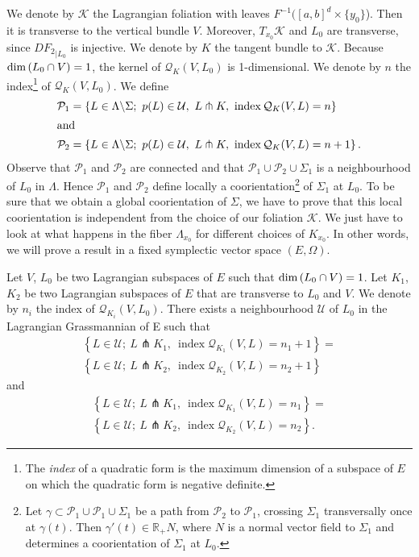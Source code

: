 \documentclass[AHL, Unicode, longabstracts, published]{cedram}
\renewcommand*\P{\mathcal{P}}
\newcommand*\cq{\mathcal{Q}}
\newcommand*\cU{\mathcal{U}}
\newcommand*\cal{\mathcal}
\newcommand*\R{\mathbb{R}}
\renewcommand*\dim{{\rm dim}\,}
\DeclareMathOperator{\Iindex}{index}
\begin{document}
We denote by ${\cal K}$ the Lagrangian foliation with leaves $F^{-1}([a, b]^d\times \{y_0\}$). Then it is transverse to the vertical bundle $V$. Moreover, $T_{x_0}{\cal K}$ and $L_0$ are transverse, since ${DF_2}_{\vert L_0}$ is injective. We denote by $K$ the tangent bundle to ${\cal K}$. { Because $\dim(L_0\cap V)=1$,} the kernel of $\cq_{K}(V, L_0)$ is 1-dimensional. We denote by $n$ the index\footnote{The \emph{index} of a quadratic form is the maximum dimension of a subspace of $E$ on which the quadratic form is negative definite.} of $\cq_{K}(V, L_0)$. We define
\begin{align*}
\P_1 &= \left\{ L\in \Lambda\backslash \Sigma;\ p(L)\in \cU,\ L\pitchfork K,\ \Iindex\cq_{K}(V, L)=n\right\}
\\
\intertext{and}
\P_2 &= \left\{ L\in \Lambda\backslash \Sigma;\ p(L)\in \cU,\ L\pitchfork K,\ \Iindex\cq_{K}(V, L)=n+1\right\}.
\end{align*}
Observe that $\P_1$ and $\P_2$ are connected and that $\P_1\cup{\P_2}\cup \Sigma_1$ is a neighbourhood of $L_0$ in $\Lambda$. Hence $\P_1$ and $\P_2$ define locally a coorientation\footnote{Let $\gamma\subset \P_1\cup\P_1\cup \Sigma_1$ be a path from $\P_2$ to $\P_1$, crossing $\Sigma_1$ transversally once at $\gamma(t)$. Then $\gamma'(t)\in \R_+ N$, where $N$ is a normal vector field to $\Sigma_1$ and determines a coorientation of $\Sigma_1$ at $L_0$.} of $\Sigma_1$ at $L_0$. To be sure that we obtain a global coorientation of $\Sigma$, we have to prove that this local coorientation is independent from the choice of our foliation ${\cal K}$. We just have to look at what happens in the fiber $\Lambda_{x_0}$ for different choices of $K_{x_0}$. In other words, we will prove a result in a fixed symplectic vector space $(E, \Omega)$.

\begin{prop}\label{Pcoorientation}
Let $V$, $L_0$ be two Lagrangian subspaces of $E$ such that $\dim (L_0\cap V)=1$. Let $K_1$, $K_2$ be two Lagrangian subspaces of $E$ that are transverse to $L_0$ and $V$. We denote by $n_i$ the index of $\cq_{K_i}(V, L_0)$. There exists a neighbourhood $\cal U$ of $L_0$ in the Lagrangian Grassmannian of E such that
\begin{multline*}
\left\{ L\in \cU;\ L\pitchfork K_1,\ \Iindex\cq_{K_1}(V, L)=n_1+1\right\}=\\
\left\{ L\in \cU;\ L\pitchfork K_2,\ \Iindex\cq_{K_2}(V, L)=n_2+1\right\}
\end{multline*}
and
\begin{multline*}
\left\{ L\in \cU;\ L\pitchfork K_1,\ \Iindex\cq_{K_1}(V, L)=n_1\right\}=\\
\left\{ L\in \cU;\ L\pitchfork K_2,\ \Iindex\cq_{K_2}(V, L)=n_2\right\}.
\end{multline*}
\end{prop}
\end{document}
